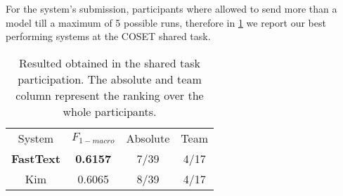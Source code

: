 For the system's submission, participants where allowed to send more than a model till a maximum of 5 possible runs, therefore in \cref{tab:results} we report our best performing systems at the COSET shared task.

\begin{comment}
\begin{table}[h]
\footnotesize
\caption{Resulted obtained in the shared task participation. The absolute and team column represent the ranking over the whole participants.}
\label{tab:resultsOLD}
\centering
\begin{tabular}{c|c|c|c}
\toprule
\hline
System		& $F_{1-macro}$		& Absolute	& Team	\\
\hline
\textbf{FastText}	& \textbf{0.6157}	& 7/39	& 4/17 \\
Kim			& 0.6065	& 8/39	& 4/17\\
\hline
\bottomrule
\end{tabular}
\end{table}
\end{comment}

\begin{table}[h]
	\centering
	\caption{Resulted obtained in the shared task participation. The absolute and team column represent the ranking over the whole participants.}
	\label{tab:results}
	\begin{tabular}{c|c|c|c}
		\hline\noalign{\smallskip}
		System		& $F_{1-macro}$		& Absolute	& Team	\\
		\noalign{\smallskip}
		\hline
		\noalign{\smallskip}
		\textbf{FastText}	& \textbf{0.6157}	& 7/39	& 4/17 \\
		Kim			& 0.6065	& 8/39	& 4/17\\
		\hline
	\end{tabular}
\end{table}